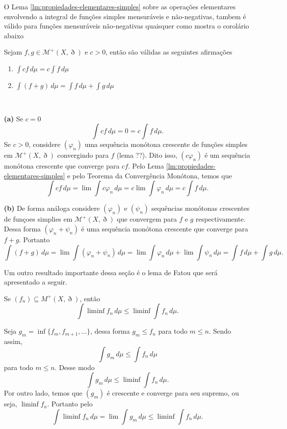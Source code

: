 \documentclass[a4paper, 11pt]{book}
\theoremstyle{definition}
\newcommand{\cM}{\mathcal{M}}
\begin{document}
O Lema \ref{lm:propiedades-elementares-simples} sobre as operações elementares envolvendo a integral de funções simples mensuráveis e não-negativas, tambem é válido para funções mensuráveis não-negativas quaisquer como mostra o corolário abaixo

\begin{cbox} \label{cl:propiedades-elementares-nao-negativa}
    Sejam $f, g \in \cM^+(X,\eth)$ e $c > 0$, então são válidas as seguintes afirmações
    \begin{enumerate}[leftmargin=*, label=\textbf{(\alph*)}]
        \item $\displaystyle \int cf \, d\mu = c \int f \,d \mu$
        \item $\displaystyle \int (f + g) \, d\mu = \int f \,d \mu + \int g \, d\mu$
    \end{enumerate}
\end{cbox}
\begin{prf}
    ~

    \textbf{(a)} Se $c = 0$
    \[
        \int c f \, d\mu = 0 = c \int f \, d\mu.
    \]
    Se $c > 0$, considere $(\varphi_n)$ uma sequência monótona crescente de funções simples em $\cM^+(X,\eth)$ convergindo para $f$ (lema ??). Dito isso, $(c\varphi_n)$ é um sequência monótona crescente que converge para $cf$. Pelo Lema \ref{lm:propiedades-elementares-simples} e pelo Teorema da Convergência Monótona, temos que
    \[
        \int cf \, d\mu = \lim \int c \varphi_n \, d\mu = c \lim \int \varphi_n \, d\mu = c \int f \, d\mu.
    \]

    \textbf{(b)} De forma análoga considere $(\varphi_n)$ e $(\psi_n)$ sequências monótonas crescentes de funçoes simplies em $\cM^+(X,\eth)$ que convergem para $f$ e $g$ respectivamente. Dessa forma $(\varphi_n + \psi_n)$ é uma sequência monótona crescente que converge para $f + g$. Portanto
    \[
        \int (f+g) \, d\mu = \lim \int (\varphi_n + \psi_n) \, d \mu = \lim \int \varphi_n \, d\mu + \lim\int \psi_n \, d\mu = \int f \, d\mu + \int g \, d\mu.
    \]
\end{prf}

Um outro resultado importante dessa seção é o lema de Fatou que será apresentado a seguir.

\begin{lbox} \label{lm:lema-de-fatou}
    Se $(f_n) \subseteq M^+ (X,\eth)$, então
    \[
        \int\liminf f_n \, d\mu\leqslant\liminf \int f_n \,d\mu.
    \]
\end{lbox}
\begin{prf}
    Seja $g_m = \inf \{ f_m, f_{m+1},\dots\}$, dessa forma $g_m \leqslant f_n$ para todo $m \leqslant n$.
    Sendo assim,
    \[
        \int g_m \, d\mu \leqslant \int f_n \, d\mu
    \]
    para todo $m \leqslant n$. Desse modo
    \[
        \int g_m \,d\mu \leqslant \liminf \int f_n \, d\mu.
    \]
    Por outro lado, temos que $(g_m)$ é crescente e converge para seu supremo, ou seja, $\liminf f_n$.
    Portanto pelo 
    \[
        \int \liminf f_n \, d\mu = \lim \int g_m \,d\mu \leqslant \liminf \int f_n\, d\mu.
    \]
\end{prf}
\end{document}
